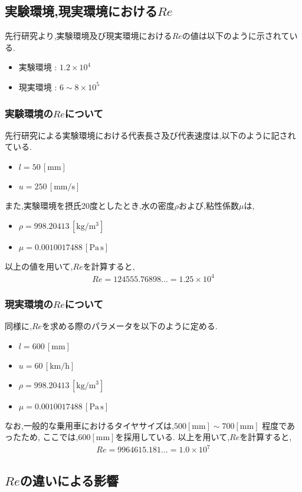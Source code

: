 \documentclass[twocolumn,a4j]{jsarticle}
\begin{document}
\subsection{実験環境,現実環境における$Re$}
先行研究より,実験環境及び現実環境における$Re$の値は以下のように示されている.
\begin{itemize}
    \item 実験環境 : $1.2 × 10^4$
    \item 現実環境 : $6 \sim 8 × 10^5$
\end{itemize}
\subsubsection{実験環境の$Re$について}
先行研究による実験環境における代表長さ及び代表速度は,以下のように記されている.
\begin{itemize}
    \item $l = 50\,[\mathrm{mm}]$
    \item $u = 250\,[\mathrm{mm/s}]$
\end{itemize}
また,実験環境を摂氏20度としたとき,水の密度$\rho$および,粘性係数$\mu$は,
\begin{itemize}
    \item $\rho = 998.20413\,[\mathrm{kg/m^3}]$
    \item $\mu = 0.0010017488\,[\mathrm{Pa\,s}]$
\end{itemize}
以上の値を用いて,$Re$を計算すると,
\begin{eqnarray}
    Re = 124555.76898\dots = 1.25 × 10^4
\end{eqnarray}
\subsubsection{現実環境の$Re$について}
同様に,$Re$を求める際のパラメータを以下のように定める.
\begin{itemize}
    \item $l = 600\,[\mathrm{mm}]$
    \item $u = 60\,[\mathrm{km/h}]$
    \item $\rho = 998.20413\,[\mathrm{kg/m^3}]$
    \item $\mu = 0.0010017488\,[\mathrm{Pa\,s}]$
\end{itemize}
なお,一般的な乗用車におけるタイヤサイズは,$500[\mathrm{mm}] \sim 700[\mathrm{mm}]$ 程度であったため,
ここでは,$600[\mathrm{mm}]$を採用している.
以上を用いて,$Re$を計算すると,
\begin{eqnarray}
    Re = 9964615.181\dots = 1.0 × 10^7
\end{eqnarray}
\subsection{$Re$の違いによる影響}
\end{document}
